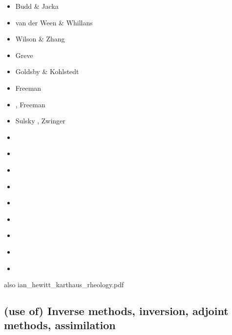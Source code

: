 \begin{scriptsize}
\begin{itemize}
\item[\nineteeneightynine] Budd \& Jacka \cite{buja89}
\item[\nineteenninety] van der Ween \& Whillans \cite{vawh90}
\item[\nineteenninetyfour] Wilson \& Zhang \cite{wizh94}
\item[\nineteenninetyseven] Greve \cite{grev97}
\item[\twothousandone] Goldsby \& Kohlstedt \cite{goko01}
\item[\twothousandfour] Freeman \etal \cite{frmm04}
\item[\twothousandsix] \cite{asbl06}, Freeman \etal \cite{frmm06}
\item[\twothousandseven] Sulsky \etal \cite{susp07}, Zwinger \etal \cite{zwgg07}
\item[\twothousandeleven] \cite{zhjg11}
\item[\twothousandtwelve] \cite{pode12}
\item[\twothousandthirteen] \cite{raab13}
\item[\twothousandfourteen] \cite{lejx14}\cite{moad14}
\item[\twothousandfifteen] \cite{issg15}\cite{frlg15}
\item[\twothousandsixteen] \cite{krab16}\cite{daws16}
\item[\twothousandseventeen] \cite{lolc17}\cite{gors17}
\item[\twothousandeighteen] \cite{heah18}\cite{mimr18}
\item[\twothousandnineteen] \cite{kudd19}\cite{kuwd19}\cite{kuiper19}
\end{itemize}
\end{scriptsize}


also ian\_hewitt\_karthaus\_rheology.pdf

\subsection{(use of) Inverse methods, inversion, adjoint methods, assimilation}

